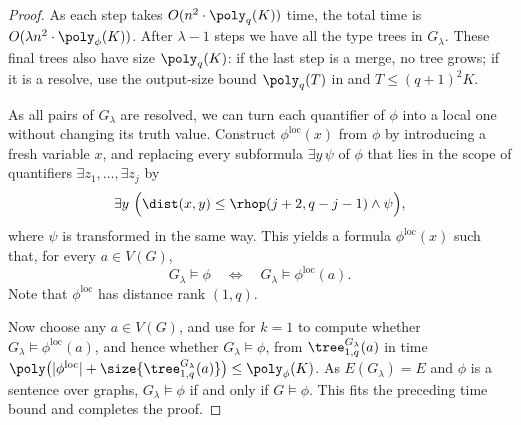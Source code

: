 \begin{proof}
As each step takes $O(n^2\cdot\poly_q(K))$ time, the total time is $O(\lambda n^2\cdot\poly_\phi(K))$.
After $\lambda-1$ steps we have all the type trees in $G_\lambda$.
These final trees also have size $\poly_q(K)$: if the last step is a merge, no tree grows; if it is a resolve, use the output-size bound $\poly_q(T)$ in  and $T\le(q+1)^2K$.

As all pairs of $G_\lambda$ are resolved,
we can turn each quantifier of $\phi$ into a local one without changing its truth value.
Construct \(\phi^{\mathrm{loc}}(x)\) from \(\phi\) by
introducing a fresh variable $x$, and replacing every subformula
$\exists y\,\psi$ of $\phi$ that lies in the scope of quantifiers
$\exists z_1,\ldots,\exists z_j$ by
\[
\exists y~\Bigl(
\dist(x,y)\le\rhop(j+2,q-j-1)
\land\psi
\Bigr),
\]
where $\psi$ is transformed in the same way.  This yields a \distFO formula
$\phi^{\mathrm{loc}}(x)$ such that, for
every $a\in V(G)$,
\[
G_\lambda\models\phi
\quad\Longleftrightarrow\quad
G_\lambda\models\phi^{\mathrm{loc}}(a).
\]
Note that $\phi^{\mathrm{loc}}$ has distance rank $(1,q)$.

Now choose any $a\in V(G)$,
and use  for $k=1$ to compute whether $G_\lambda\models\phi^{\mathrm{loc}}(a)$,
and hence whether $G_\lambda\models\phi$, from
$\tree^{G_\lambda}_{1,q}(a)$ in time
$\poly\bigl(|\phi^{\mathrm{loc}}|+\size{\tree^{G_\lambda}_{1,q}(a)}\bigr)\le\poly_\phi(K)$.
As $E(G_\lambda)=E$ and $\phi$ is a sentence over graphs, $G_\lambda\models\phi$ if and only if $G\models\phi$.
This fits the preceding time bound and completes the proof.
\end{proof}

